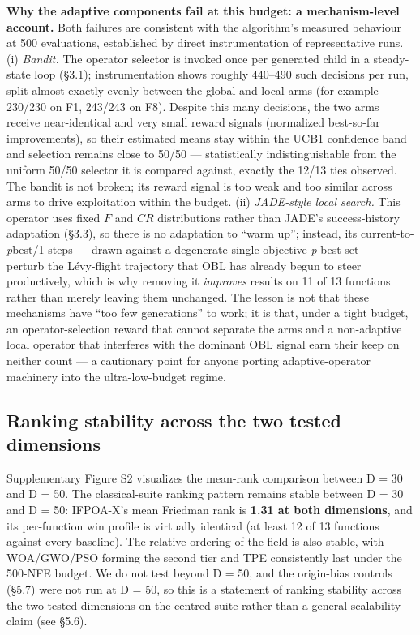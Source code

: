 \documentclass[preprint,12pt]{elsarticle}
\begin{document}
\textbf{Why the adaptive components fail at this budget: a mechanism-level account.} Both failures are consistent with the algorithm's measured behaviour at 500 evaluations, established by direct instrumentation of representative runs. (i) \emph{Bandit.} The operator selector is invoked once per generated child in a steady-state loop (\S3.1); instrumentation shows roughly 440--490 such decisions per run, split almost exactly evenly between the global and local arms (for example 230/230 on F1, 243/243 on F8). Despite this many decisions, the two arms receive near-identical and very small reward signals (normalized best-so-far improvements), so their estimated means stay within the UCB1 confidence band and selection remains close to 50/50 --- statistically indistinguishable from the uniform 50/50 selector it is compared against, exactly the 12/13 ties observed. The bandit is not broken; its reward signal is too weak and too similar across arms to drive exploitation within the budget. (ii) \emph{JADE-style local search.} This operator uses fixed $F$ and $CR$ distributions rather than JADE's success-history adaptation (\S3.3), so there is no adaptation to ``warm up''; instead, its current-to-\emph{p}best/1 steps --- drawn against a degenerate single-objective \emph{p}-best set --- perturb the L\'evy-flight trajectory that OBL has already begun to steer productively, which is why removing it \emph{improves} results on 11 of 13 functions rather than merely leaving them unchanged. The lesson is not that these mechanisms have ``too few generations'' to work; it is that, under a tight budget, an operator-selection reward that cannot separate the arms and a non-adaptive local operator that interferes with the dominant OBL signal earn their keep on neither count --- a cautionary point for anyone porting adaptive-operator machinery into the ultra-low-budget regime.

\subsection{Ranking stability across the two tested dimensions}
\label{subsec5-5}
Supplementary Figure S2 visualizes the mean-rank comparison between D = 30 and D = 50.
The classical-suite ranking pattern remains stable between D = 30 and D = 50: IFPOA-X's mean Friedman rank is \textbf{1.31 at both dimensions}, and its per-function win profile is virtually identical (at least 12 of 13 functions against every baseline). The relative ordering of the field is also stable, with WOA/GWO/PSO forming the second tier and TPE consistently last under the 500-NFE budget. We do not test beyond D = 50, and the origin-bias controls (\S5.7) were not run at D = 50, so this is a statement of ranking stability across the two tested dimensions on the centred suite rather than a general scalability claim (see \S5.6).
\end{document}
